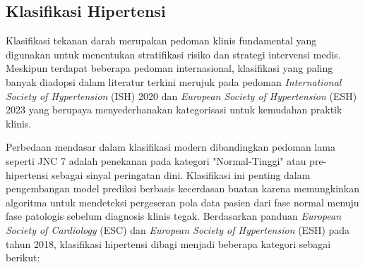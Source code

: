 \subsection{Klasifikasi Hipertensi}
\noindent Klasifikasi tekanan darah merupakan pedoman klinis fundamental yang digunakan untuk menentukan stratifikasi risiko dan strategi intervensi medis. Meskipun terdapat beberapa pedoman internasional, klasifikasi yang paling banyak diadopsi dalam literatur terkini merujuk pada pedoman \textit{International Society of Hypertension} (ISH) 2020 dan \textit{European Society of Hypertension} (ESH) 2023 yang berupaya menyederhanakan kategorisasi untuk kemudahan praktik klinis.

Perbedaan mendasar dalam klasifikasi modern dibandingkan pedoman lama seperti JNC 7 adalah penekanan pada kategori "Normal-Tinggi" atau pre-hipertensi sebagai sinyal peringatan dini. Klasifikasi ini penting dalam pengembangan model prediksi berbasis kecerdasan buatan karena memungkinkan algoritma untuk mendeteksi pergeseran pola data pasien dari fase normal menuju fase patologis sebelum diagnosis klinis tegak. Berdasarkan panduan \textit{European Society of Cardiology} (ESC) dan \textit{European Society of Hypertension} (ESH) pada tahun 2018, klasifikasi hipertensi dibagi menjadi beberapa kategori sebagai berikut:

